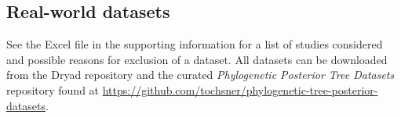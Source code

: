 \documentclass[10pt,letterpaper]{article}
\begin{document}
\subsection*{Real-world datasets}

See the Excel file in the supporting information for a list of studies considered and possible reasons for exclusion of a dataset. All datasets can be downloaded from the Dryad repository \cite{dryad} and the curated \emph{Phylogenetic Posterior Tree Datasets} repository \cite{tree_dataset} found at \url{https://github.com/tochsner/phylogenetic-tree-posterior-datasets}.

\nolinenumbers


\end{document}
